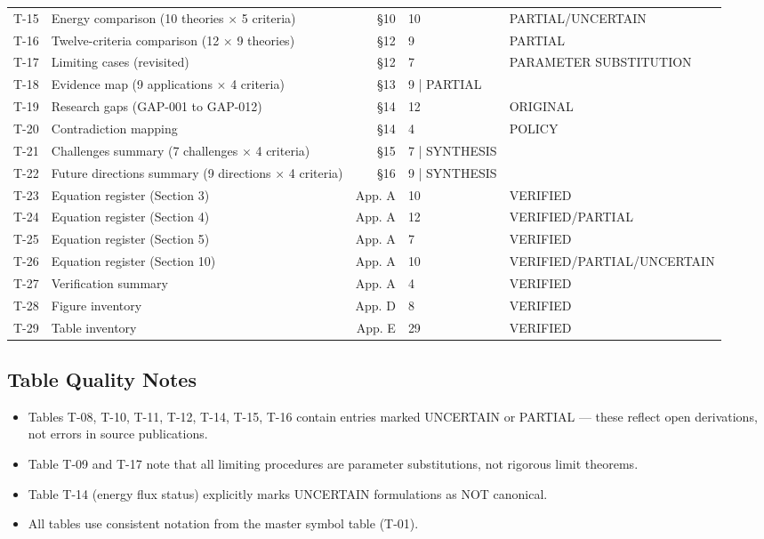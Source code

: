 \begin{table}[h]
\begin{tabularx}{\textwidth}{@{}lXrlX@{}}
T-15 & Energy comparison (10 theories $\times$ 5 criteria) & §10 & 10 & PARTIAL/UNCERTAIN \\
T-16 & Twelve-criteria comparison (12 $\times$ 9 theories) & §12 & 9 & PARTIAL \\
T-17 & Limiting cases (revisited) & §12 & 7 & PARAMETER SUBSTITUTION \\
T-18 & Evidence map (9 applications $\times$ 4 criteria) & §13 & 9 | PARTIAL \\
T-19 & Research gaps (GAP-001 to GAP-012) & §14 & 12 & ORIGINAL \\
T-20 & Contradiction mapping & §14 & 4 & POLICY \\
T-21 & Challenges summary (7 challenges $\times$ 4 criteria) & §15 & 7 | SYNTHESIS \\
T-22 & Future directions summary (9 directions $\times$ 4 criteria) & §16 & 9 | SYNTHESIS \\
T-23 & Equation register (Section 3) & App. A & 10 & VERIFIED \\
T-24 & Equation register (Section 4) & App. A & 12 & VERIFIED/PARTIAL \\
T-25 & Equation register (Section 5) & App. A & 7 & VERIFIED \\
T-26 & Equation register (Section 10) & App. A & 10 & VERIFIED/PARTIAL/UNCERTAIN \\
T-27 & Verification summary & App. A & 4 & VERIFIED \\
T-28 & Figure inventory & App. D & 8 & VERIFIED \\
T-29 & Table inventory & App. E & 29 & VERIFIED \\
\bottomrule
\end{tabularx}
\end{table}

\subsection{Table Quality Notes}

\begin{itemize}
\item Tables T-08, T-10, T-11, T-12, T-14, T-15, T-16 contain entries marked UNCERTAIN or PARTIAL — these reflect open derivations, not errors in source publications.
\item Table T-09 and T-17 note that all limiting procedures are parameter substitutions, not rigorous limit theorems.
\item Table T-14 (energy flux status) explicitly marks UNCERTAIN formulations as NOT canonical.
\item All tables use consistent notation from the master symbol table (T-01).
\end{itemize}


